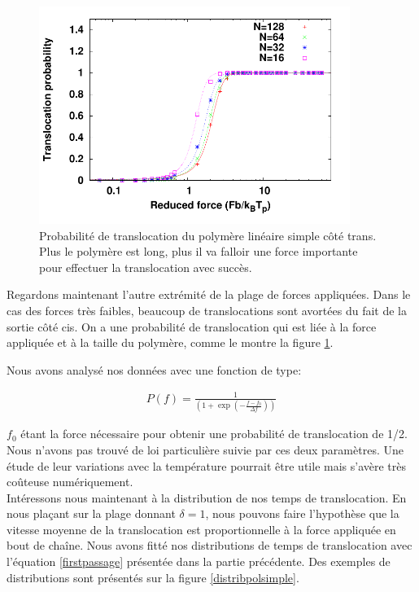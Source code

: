 \begin{figure}[H]
\begin{center}
\includegraphics[width=0.9\textwidth]{probatranslocsimplepol.pdf}


\caption[Probabilité de translocation du polymère simple]{Probabilité de translocation du polymère linéaire simple côté trans. Plus le polymère est long, plus il va falloir une force importante pour effectuer la translocation avec succès.}
\label{probatranslocpolsimple}
\end{center}
\end{figure}

Regardons maintenant l'autre extrémité de la plage de forces appliquées. Dans le cas des forces très faibles, beaucoup de translocations sont avortées du fait de la sortie côté cis. On a une probabilité de translocation qui est liée à la force appliquée et à la taille du polymère, comme le montre la figure \ref{probatranslocpolsimple}.



Nous avons analysé nos données avec une fonction de type:

\begin{eqnarray}
P(f) =  \frac{1}{\left( 1+\exp\left(-\frac{f-f_{0}}{\Delta f} \right) \right)} 
\label{probtransloc}
\end{eqnarray}
 
$f_{0}$ étant la force nécessaire pour obtenir une probabilité de translocation de 1/2. Nous n'avons pas trouvé de loi particulière suivie par ces deux paramètres. Une étude de leur variations avec la température pourrait être utile mais s'avère très coûteuse numériquement.\\ 

Intéressons nous maintenant à la distribution de nos temps de translocation. En nous plaçant sur la plage donnant $\delta=1$, nous pouvons faire l'hypothèse que la vitesse moyenne de la translocation est proportionnelle à la force appliquée en bout de chaîne.  Nous avons fitté nos distributions de temps de translocation avec l'équation \ref{firstpassage} présentée dans la partie précédente. Des exemples de distributions sont présentés sur la figure \ref{distribpolsimple}.

